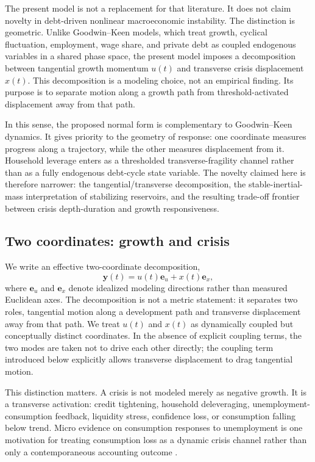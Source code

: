 \documentclass[11pt]{article}
\begin{document}
The present model is not a replacement for that literature. It does not claim novelty in debt-driven nonlinear macroeconomic instability. The distinction is geometric. Unlike Goodwin--Keen models, which treat growth, cyclical fluctuation, employment, wage share, and private debt as coupled endogenous variables in a shared phase space, the present model imposes a decomposition between tangential growth momentum $u(t)$ and transverse crisis displacement $x(t)$. This decomposition is a modeling choice, not an empirical finding. Its purpose is to separate motion along a growth path from threshold-activated displacement away from that path.

In this sense, the proposed normal form is complementary to Goodwin--Keen dynamics. It gives priority to the geometry of response: one coordinate measures progress along a trajectory, while the other measures displacement from it. Household leverage enters as a thresholded transverse-fragility channel rather than as a fully endogenous debt-cycle state variable. The novelty claimed here is therefore narrower: the tangential/transverse decomposition, the stable-inertial-mass interpretation of stabilizing reservoirs, and the resulting trade-off frontier between crisis depth-duration and growth responsiveness.

\subsection{Two coordinates: growth and crisis}
We write an effective two-coordinate decomposition,
\begin{equation}
\bm{y}(t)=u(t)\bm{e}_u+x(t)\bm{e}_x,
\label{eq:state}
\end{equation}
where $\bm{e}_u$ and $\bm{e}_x$ denote idealized modeling directions rather than measured Euclidean axes. The decomposition is not a metric statement: it separates two roles, tangential motion along a development path and transverse displacement away from that path. We treat $u(t)$ and $x(t)$ as dynamically coupled but conceptually distinct coordinates. In the absence of explicit coupling terms, the two modes are taken not to drive each other directly; the coupling term introduced below explicitly allows transverse displacement to drag tangential motion.

This distinction matters. A crisis is not modeled merely as negative growth. It is a transverse activation: credit tightening, household deleveraging, unemployment-consumption feedback, liquidity stress, confidence loss, or consumption falling below trend. Micro evidence on consumption responses to unemployment is one motivation for treating consumption loss as a dynamic crisis channel rather than only a contemporaneous accounting outcome \cite{Fagereng2024}.
\end{document}
